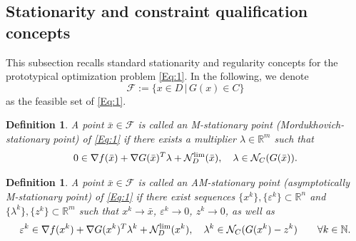 \documentclass[11pt,a4paper,reqno]{amsart}
\newtheorem{lemma}[theorem]{Lemma}
\newtheorem{definition}[theorem]{Definition}
\begin{document}
{%

\subsection{Stationarity and constraint qualification concepts}
This subsection recalls standard stationarity and regularity concepts for the prototypical optimization problem \eqref{Eq:1}. In the following, we denote
\[
\mathcal F:=\{x\in D \,|\, G(x)\in C\}
\]
as the feasible set of \eqref{Eq:1}. 

\begin{definition}\label{Def:MStat}
A point $ \bar x \in \mathcal F $ is called an \emph{M-stationary point} (Mordukhovich-stationary point) 
of \eqref{Eq:1} if there exists a multiplier $ \lambda \in \mathbb R^m $
such that 
\begin{equation*}
    0 \in \nabla f(\bar x) + \nabla G(\bar x)^T \lambda + \mathcal{N}_D^\textup{lim} (\bar x),
    \quad 
    \lambda \in \mathcal{N}_C ( G(\bar x) ).
\end{equation*}
\end{definition}

\begin{definition}\label{Def:AMStat}
A point $ \bar x \in \mathcal F $ is called an \emph{AM-stationary point} (asymptotically M-stationary point) 
of \eqref{Eq:1} if there exist sequences 
$\{ x^k \},\{\varepsilon^k\}\subset\mathbb R^n$ and $\{\lambda^k\},\{ z^k \} \subset\mathbb R^m$ such that
$x^k\to\bar x$, $\varepsilon^k\to 0$, $z^k\to 0$, as well as
\begin{equation*}
   \varepsilon^k \in \nabla f(x^k) + \nabla G(x^k)^T \lambda^k + \mathcal N_D^\textup{lim} (x^k),
   \quad\lambda^k \in \mathcal{N}_C( G(x^k) - z^k)
   \qquad
   \forall k\in\mathbb N.
\end{equation*}
\end{definition}

}
\end{document}
